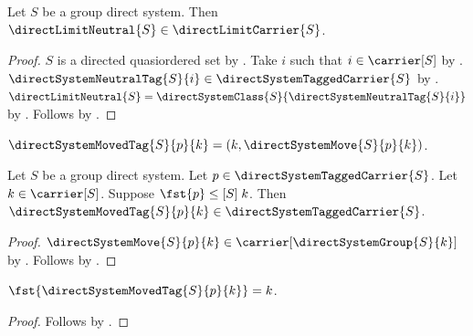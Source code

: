 \begin{proposition}\label{direct_limit_neutral_type}
    Let $S$ be a group direct system.
    Then $\directLimitNeutral{S}\in\directLimitCarrier{S}$.
\end{proposition}
\begin{proof}
    $S$ is a directed quasiordered set by
        .
    Take $i$ such that $i\in\carrier[S]$ by
        .
    $\directSystemNeutralTag{S}{i}\in\directSystemTaggedCarrier{S}$ by
        .
    $\directLimitNeutral{S}=
        \directSystemClass{S}{\directSystemNeutralTag{S}{i}}$ by
        .
    Follows by .
\end{proof}

\begin{definition}\label{direct_system_moved_tag}
    $\directSystemMovedTag{S}{p}{k}=
        (k,\directSystemMove{S}{p}{k})$.
\end{definition}

\begin{proposition}\label{direct_system_moved_tag_type}
    Let $S$ be a group direct system.
    Let $p\in\directSystemTaggedCarrier{S}$.
    Let $k\in\carrier[S]$.
    Suppose $\fst{p}\mathrel{\leq[S]}k$.
    Then $\directSystemMovedTag{S}{p}{k}\in
        \directSystemTaggedCarrier{S}$.
\end{proposition}
\begin{proof}
    $\directSystemMove{S}{p}{k}\in
        \carrier[\directSystemGroup{S}{k}]$ by
        .
    Follows by
        .
\end{proof}

\begin{proposition}\label{direct_system_moved_tag_first}
    $\fst{\directSystemMovedTag{S}{p}{k}}=k$.
\end{proposition}
\begin{proof}
    Follows by .
\end{proof}

